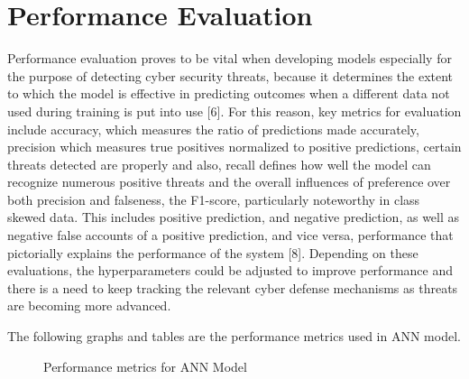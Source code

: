 \documentclass{llncs}
\begin{document}
\section{Performance Evaluation}
Performance evaluation proves to be vital when developing models especially for the purpose of detecting cyber security threats, because it determines the extent to which the model is effective in predicting outcomes when a different data not used during training is put into use [6]. For this reason, key metrics for evaluation include accuracy, which measures the ratio of predictions made accurately, precision which measures true positives normalized to positive predictions, certain threats detected are properly and also, recall defines how well the model can recognize numerous positive threats and the overall influences of preference over both precision and falseness, the F1-score, particularly noteworthy in class skewed data. This includes positive prediction, and negative prediction, as well as negative false accounts of a positive prediction, and vice versa, performance that pictorially explains the performance of the system [8]. Depending on these evaluations, the hyperparameters could be adjusted to improve performance and there is a need to keep tracking the relevant cyber defense mechanisms as threats are becoming more advanced.

The following graphs and tables are the performance metrics used in  ANN model.

\begin{figure}[htbp]
\hspace{-1.2cm}
    \hspace{-0.5cm}
    \caption{\small{Performance metrics for ANN Model}}
    \label{fig:abc}
\end{figure}
\end{document}

